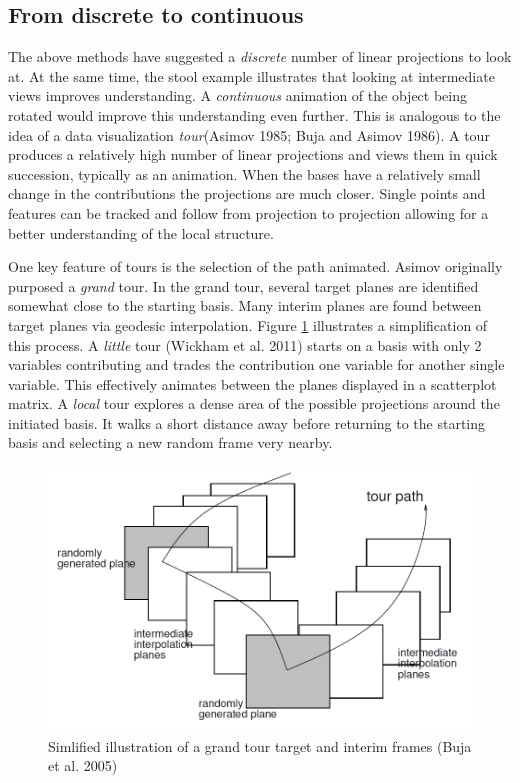 \documentclass[11,]{article}
\begin{document}
\hypertarget{from-discrete-to-continuous}{%
\subsection{From discrete to continuous}\label{from-discrete-to-continuous}}

The above methods have suggested a \emph{discrete} number of linear projections to look at. At the same time, the stool example illustrates that looking at intermediate views improves understanding. A \emph{continuous} animation of the object being rotated would improve this understanding even further. This is analogous to the idea of a data visualization \emph{tour}(Asimov 1985; Buja and Asimov 1986). A tour produces a relatively high number of linear projections and views them in quick succession, typically as an animation. When the bases have a relatively small change in the contributions the projections are much closer. Single points and features can be tracked and follow from projection to projection allowing for a better understanding of the local structure.

One key feature of tours is the selection of the path animated.
Asimov originally purposed a \emph{grand} tour. In the grand tour, several target planes are identified somewhat close to the starting basis. Many interim planes are found between target planes via geodesic interpolation. Figure \ref{fig:grandFrames} illustrates a simplification of this process. A \emph{little} tour (Wickham et al. 2011) starts on a basis with only 2 variables contributing and trades the contribution one variable for another single variable. This effectively animates between the planes displayed in a scatterplot matrix. A \emph{local} tour explores a dense area of the possible projections around the initiated basis. It walks a short distance away before returning to the starting basis and selecting a new random frame very nearby.

\begin{figure}

{\centering \includegraphics[width=0.8\linewidth]{figures/buja05fig} 

}

\caption{Simlified illustration of a grand tour target and interim frames  (Buja et al. 2005)}\label{fig:grandFrames}
\end{figure}
\end{document}
